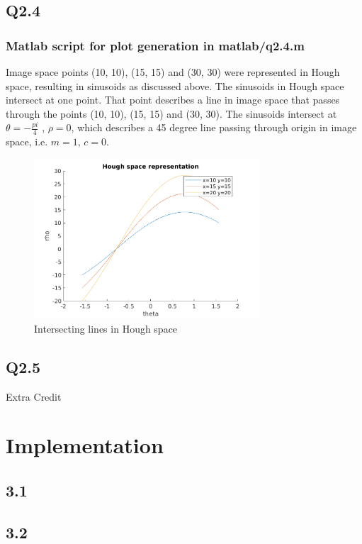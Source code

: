 \documentclass[12pt]{article}
\begin{document}
\subsection{Q2.4  }
\subsubsection{ Matlab script for plot generation in matlab/q2.4.m}
Image space points (10, 10), (15, 15) and (30, 30) were represented in Hough space, resulting in sinusoids as discussed above. The sinusoids in Hough space intersect at one point. That point describes a line in image space that passes through the points (10, 10), (15, 15) and (30, 30). The sinusoids intersect at $\theta = - \frac{pi}{4}$ , $\rho = 0$, which describes a 45 degree line passing through origin in image space, i.e. $m=1$, $c=0$.



\begin{figure}[H]
\centering
\includegraphics[page=1,width=0.75\textwidth]{q2_4}
\caption{Intersecting lines in Hough space}    
\label{fig:bblr}
\end{figure}   


\subsection{Q2.5  }
Extra Credit

\section{Implementation}

\subsection{3.1}
\subsection{3.2}
\end{document}
